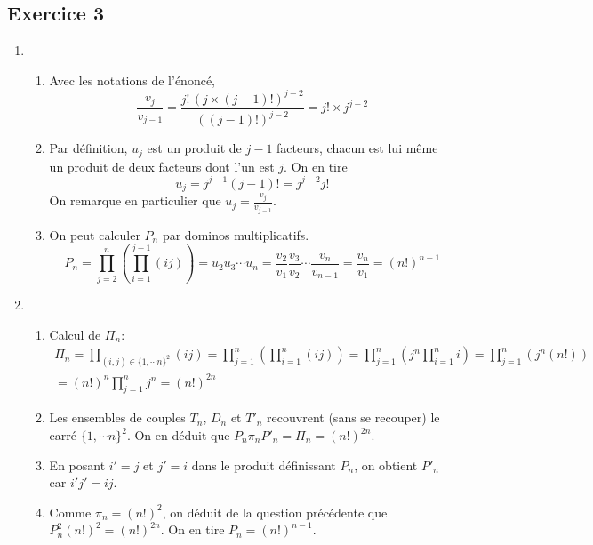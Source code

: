 \subsection*{Exercice 3}
\begin{enumerate}
 \item 
\begin{enumerate}
 \item Avec les notations de l'énoncé,
\begin{displaymath}
 \frac{v_j}{v_{j-1}} = \frac{j!\,(j\times (j-1)!)^{j-2}}{((j-1)!)^{j-2}}=j!\times j^{j-2}
\end{displaymath}

 \item Par définition, $u_j$ est un produit de $j-1$ facteurs, chacun est lui même un produit de deux facteurs dont l'un est $j$. On en tire
\begin{displaymath}
 u_j = j^{j-1} (j-1)! = j^{j-2} j!
\end{displaymath}
On remarque en particulier que $u_j = \frac{v_j}{v_{j-1}}$.
 \item On peut calculer $P_n$ par \og dominos multiplicatifs\fg.
\begin{displaymath}
 P_n = \prod_{j=2}^{n}\left( \prod_{i=1}^{j-1}(ij)\right) = u_2 u_3\cdots u_n
 = \frac{v_2}{v_{1}} \frac{v_3}{v_{2}}\cdots \frac{v_n}{v_{n-1}}=\frac{v_n}{v_{1}} = (n!)^{n-1}
\end{displaymath}

\end{enumerate}

 \item 
\begin{enumerate}
 \item Calcul de $\Pi_n$:
\begin{multline*}
 \Pi_n = \prod_{(i,j)\in \{1,\cdots n\}^2 }(ij)
= \prod_{j=1}^{n}\left( \prod_{i=1}^{n}(ij)\right)
= \prod_{j=1}^{n}\left( j^n\prod_{i=1}^{n}i\right)
= \prod_{j=1}^{n}\left( j^n(n!)\right)\\
= (n!)^n \prod_{j=1}^{n}j^n
= (n!)^{2n}
\end{multline*}

 \item Les ensembles de couples $T_n$, $D_n$ et $T'_n$ recouvrent (sans se recouper) le carré $\{1,\cdots n\}^2$. On en déduit que
$P_n \pi_n P'_n = \Pi_n = (n!)^{2n}$.

 \item En posant $i'=j$ et $j'=i$ dans le produit définissant $P_n$, on obtient $P'_n$ car $i'j'=ij$. 

 \item Comme $\pi_n=(n!)^2$, on déduit de la question précédente que $P_n^2 (n!)^2 = (n!)^{2n}$. On en tire $P_n = (n!)^{n-1}$.
\end{enumerate}

\end{enumerate}

